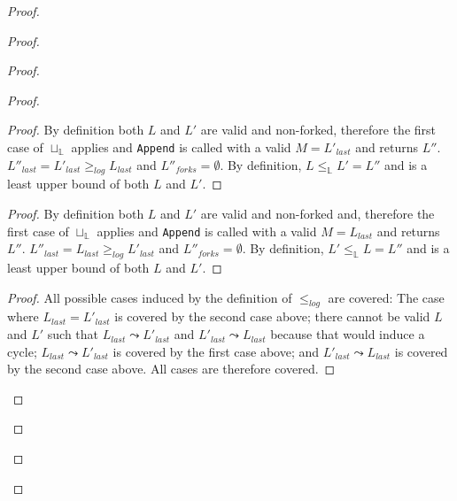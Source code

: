 \documentclass[9pt, oneside]{article}   	%
\newcommand{\logleadsto}{\overset{\textit{log}}\leadsto}
\begin{document}
\begin{proof}
	\begin{proof}
		\begin{proof}
			\begin{proof}			
				\step{}{\case{$L_\textit{last} \logleadsto L'_\textit{last}$}}
				\begin{proof}
					By definition both $L$ and $L'$ are valid and non-forked, therefore the first case of $\sqcup_\mathds{L}$ applies and \texttt{Append} is called with a valid $M=L'_\textit{last}$ and returns $L''$. $L''_\textit{last} = L'_\textit{last} \geq_\textit{log} L_\textit{last}$ and $L''_\textit{forks} = \emptyset$. By definition, $L \leq_\mathds{L} L' = L''$ and is a least upper bound of both $L$ and $L'$.
				\end{proof}
			
				\begin{proof}
					By definition both $L$ and $L'$ are valid and non-forked and, therefore the first case of $\sqcup_\mathds{L}$ applies and \texttt{Append} is called with a valid $M=L_\textit{last}$ and returns $L''$. $L''_\textit{last} = L_\textit{last} \geq_\textit{log} L'_\textit{last}$ and $L''_\textit{forks} = \emptyset$. By definition, $L' \leq_\mathds{L} L = L''$ and is a least upper bound of both $L$ and $L'$.
				\end{proof}
				
				\qedstep
				\begin{proof}
					All possible cases induced by the definition of $\leq_\textit{log}$ are covered: The case where $L_\textit{last} = L'_\textit{last}$ is covered by the second case above; there cannot be valid $L$ and $L'$ such that $L_\textit{last} \leadsto L'_\textit{last}$ and $L'_\textit{last} \leadsto L_\textit{last}$ because that would induce a cycle;  $L_\textit{last} \leadsto L'_\textit{last}$ is covered by the first case above; and $L'_\textit{last} \leadsto L_\textit{last}$ is covered by the second case above. All cases are therefore covered.
				\end{proof}
			\end{proof}
			

\end{proof}
\end{proof}
\end{proof}
\end{document}
